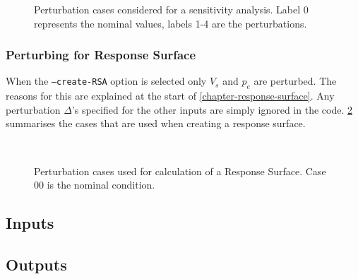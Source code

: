 \begin{figure}[ht!]%
\centering
{}
\caption{Perturbation cases considered for a sensitivity analysis. Label 0 represents the nominal values, labels 1-4 are the perturbations.}%
\label{sensitivity_perturbations}%
\end{figure}

\subsubsection{Perturbing for Response Surface}
When the \texttt{--create-RSA} option is selected only $V_s$ and $p_e$ are perturbed. The reasons for this are explained at the start of \cref{chapter-response-surface}. Any perturbation $\Delta$'s specified for the other inputs are simply ignored in the code. \cref{RSA_perturbations} summarises the cases that are used when creating a response surface.

\begin{figure}[ht!]%
\centering
{} \quad {}\\%
\caption{Perturbation cases used for calculation of a Response Surface. Case 00 is the nominal condition.}%
\label{RSA_perturbations}%
\end{figure}

\subsection{Inputs}

\subsection{Outputs}